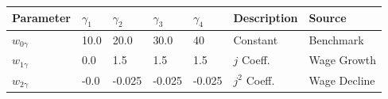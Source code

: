 \small\begin{tabular}{l l l l l l l} 
\hline 
 Parameter & $\gamma_1$ &  $\gamma_2$ & $\gamma_3$ & $\gamma_4$ & Description & Source \\ 
\hline 
$w_{0\gamma}$ & 10.0 & 20.0 
               & 30.0 & 40 
               & Constant & Benchmark \\ 
$w_{1\gamma}$ & 0.0 &  1.5 
               & 1.5 & 1.5 
               & $j$ Coeff. & Wage Growth \\ 
$w_{2\gamma}$ & -0.0 &  -0.025 
               & -0.025 & -0.025 
               & $j^{2}$ Coeff. & Wage Decline \\ 
\hline 
\end{tabular}
